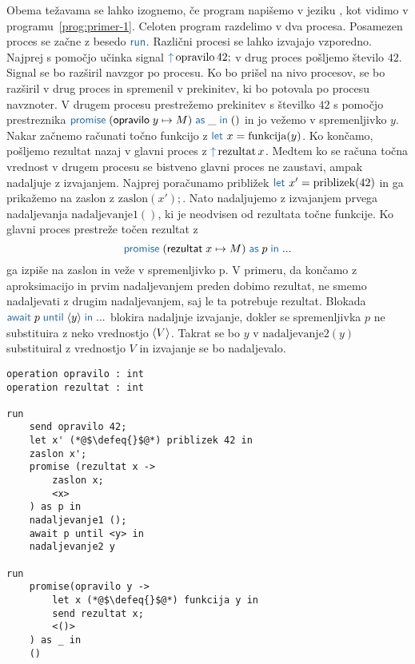 Obema težavama se lahko izognemo, če program napišemo v jeziku \aeff, kot vidimo v programu~\ref{prog:primer-1}. Celoten program razdelimo v dva procesa. Posamezen proces se začne z besedo $\tmkw{run}$. Različni procesi se lahko izvajajo vzporedno.
Najprej s pomočjo učinka signal $\tmkw{\uparrow}\, \text{opravilo}\,42;$ v drug proces pošljemo število $42$. Signal se bo razširil navzgor po procesu. Ko bo prišel na nivo procesov, se bo razširil v drug proces in spremenil v prekinitev, ki bo potovala po procesu navznoter. V drugem procesu prestrežemo prekinitev s številko $42$ s pomočjo prestreznika $\tmwith{opravilo}{y}{M}{\_}{()}$ in jo vežemo v spremenljivko $y$. Nakar začnemo računati točno funkcijo z $\tmkw{let}\ x = \text{funkcija}(y)$. Ko končamo, pošljemo rezultat nazaj v glavni proces z $\tmkw{\uparrow}\, \text{rezultat}\,x$.
Medtem ko se računa točna vrednost v drugem procesu se bistveno glavni proces ne zaustavi, ampak nadaljuje z izvajanjem. Najprej poračunamo približek $\tmkw{let}\ x' = \text{priblizek}(42)$ in ga prikažemo na zaslon z $\text{zaslon}(x');$. Nato nadaljujemo z izvajanjem prvega nadaljevanja $\text{nadaljevanje}1()$, ki je neodvisen od rezultata točne funkcije. Ko glavni proces prestreže točen rezultat z $$\tmwith{rezultat}{x}{M}{p}{...}$$ ga izpiše na zaslon in veže v spremenljivko p. V primeru, da končamo z aproksimacijo in prvim nadaljevanjem preden dobimo rezultat, ne smemo nadaljevati z drugim nadaljevanjem, saj le ta potrebuje rezultat. Blokada $\tmawait{p}{y}{...}$ blokira nadaljnje izvajanje, dokler se spremenljivka $p$ ne substituira z neko vrednostjo $\langle V \rangle$. Takrat se bo $y$ v $\text{nadaljevanje}2(y)$ substituiral z vrednostjo $V$ in izvajanje se bo nadaljevalo.

\begin{lstlisting}[caption={Asinhron vzporeden primer.},label={prog:primer-1},floatplacement=H]
operation opravilo : int
operation rezultat : int

run 
	send opravilo 42;
	let x' (*@$\defeq{}$@*) priblizek 42 in
	zaslon x';
	promise (rezultat x ->
	   	zaslon x;
	   	<x>
	) as p in
	nadaljevanje1 ();
	await p until <y> in
	nadaljevanje2 y

run 
	promise(opravilo y ->
	   	let x (*@$\defeq{}$@*) funkcija y in
	   	send rezultat x;
	   	<()>
	) as _ in
	()
\end{lstlisting}




